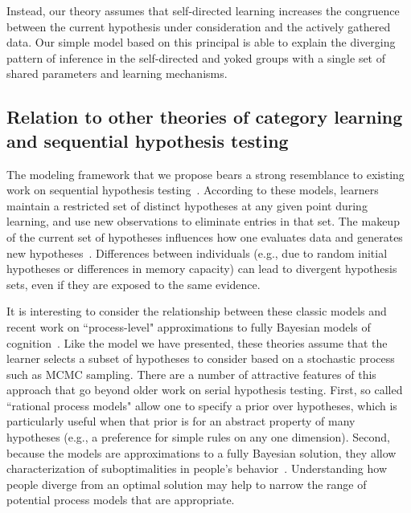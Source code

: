 \documentclass[3p,twocolumn,authoryear,10pt]{elsarticle}
\begin{document}
Instead, our theory assumes that self-directed learning increases the congruence between the current hypothesis under consideration and the actively gathered data.  Our simple model based on this principal is able to explain the diverging
pattern of inference in the self-directed and yoked groups with a single set of shared parameters and learning mechanisms.





\subsection{Relation to other theories of category learning and sequential hypothesis testing}

The modeling framework that we propose bears a strong resemblance to existing work on sequential hypothesis testing~\citep{Bower:1964kn,gregg1967process,millward1973direct,thomas2008diagnostic,nosofsky1998rule}. According to these models, learners maintain a restricted set of distinct hypotheses at any given point during learning, and use new observations to eliminate entries in that set. The makeup of the current set of hypotheses influences how one evaluates data and generates new hypotheses~\citep{thomas2008diagnostic}. Differences between individuals (e.g., due to random initial hypotheses or differences in memory capacity) can lead to divergent hypothesis sets, even if they are exposed to the same evidence.

It is interesting to consider the relationship between these classic models and recent work on ``process-level" approximations to fully Bayesian models of cognition~\citep{brown2009detecting,Ullman:2010p14180}. Like the model we have presented, these theories assume that the learner selects a subset of hypotheses to consider based on a stochastic process such as MCMC sampling.  There are a number of attractive features of this approach that go beyond older work on serial hypothesis testing. First, so called ``rational process models" allow one to specify a prior over hypotheses, which is particularly useful when that prior is for an abstract property of many hypotheses (e.g., a preference for simple rules on any one dimension). Second, because the models are approximations to a fully Bayesian solution, they allow characterization of suboptimalities in people's behavior~\citep{brown2009detecting}. Understanding how people diverge from an optimal solution may help to narrow the range of potential process models that are appropriate.
\end{document}
